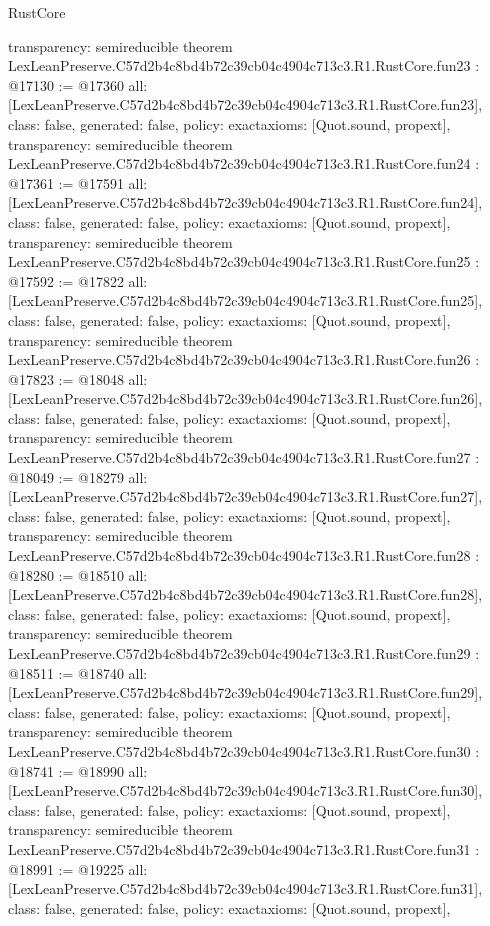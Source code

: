 \begin{lexlean}{RustCore}
\begin{coremodule}
{  transparency: semireducible
}
theorem LexLeanPreserve.C57d2b4c8bd4b72c39cb04c4904c713c3.R1.RustCore.fun23 : @17130 := @17360 {
  all: [LexLeanPreserve.C57d2b4c8bd4b72c39cb04c4904c713c3.R1.RustCore.fun23],
  class: false,
  generated: false,
  policy: exact{axioms: [Quot.sound, propext]},
  transparency: semireducible
}
theorem LexLeanPreserve.C57d2b4c8bd4b72c39cb04c4904c713c3.R1.RustCore.fun24 : @17361 := @17591 {
  all: [LexLeanPreserve.C57d2b4c8bd4b72c39cb04c4904c713c3.R1.RustCore.fun24],
  class: false,
  generated: false,
  policy: exact{axioms: [Quot.sound, propext]},
  transparency: semireducible
}
theorem LexLeanPreserve.C57d2b4c8bd4b72c39cb04c4904c713c3.R1.RustCore.fun25 : @17592 := @17822 {
  all: [LexLeanPreserve.C57d2b4c8bd4b72c39cb04c4904c713c3.R1.RustCore.fun25],
  class: false,
  generated: false,
  policy: exact{axioms: [Quot.sound, propext]},
  transparency: semireducible
}
theorem LexLeanPreserve.C57d2b4c8bd4b72c39cb04c4904c713c3.R1.RustCore.fun26 : @17823 := @18048 {
  all: [LexLeanPreserve.C57d2b4c8bd4b72c39cb04c4904c713c3.R1.RustCore.fun26],
  class: false,
  generated: false,
  policy: exact{axioms: [Quot.sound, propext]},
  transparency: semireducible
}
theorem LexLeanPreserve.C57d2b4c8bd4b72c39cb04c4904c713c3.R1.RustCore.fun27 : @18049 := @18279 {
  all: [LexLeanPreserve.C57d2b4c8bd4b72c39cb04c4904c713c3.R1.RustCore.fun27],
  class: false,
  generated: false,
  policy: exact{axioms: [Quot.sound, propext]},
  transparency: semireducible
}
theorem LexLeanPreserve.C57d2b4c8bd4b72c39cb04c4904c713c3.R1.RustCore.fun28 : @18280 := @18510 {
  all: [LexLeanPreserve.C57d2b4c8bd4b72c39cb04c4904c713c3.R1.RustCore.fun28],
  class: false,
  generated: false,
  policy: exact{axioms: [Quot.sound, propext]},
  transparency: semireducible
}
theorem LexLeanPreserve.C57d2b4c8bd4b72c39cb04c4904c713c3.R1.RustCore.fun29 : @18511 := @18740 {
  all: [LexLeanPreserve.C57d2b4c8bd4b72c39cb04c4904c713c3.R1.RustCore.fun29],
  class: false,
  generated: false,
  policy: exact{axioms: [Quot.sound, propext]},
  transparency: semireducible
}
theorem LexLeanPreserve.C57d2b4c8bd4b72c39cb04c4904c713c3.R1.RustCore.fun30 : @18741 := @18990 {
  all: [LexLeanPreserve.C57d2b4c8bd4b72c39cb04c4904c713c3.R1.RustCore.fun30],
  class: false,
  generated: false,
  policy: exact{axioms: [Quot.sound, propext]},
  transparency: semireducible
}
theorem LexLeanPreserve.C57d2b4c8bd4b72c39cb04c4904c713c3.R1.RustCore.fun31 : @18991 := @19225 {
  all: [LexLeanPreserve.C57d2b4c8bd4b72c39cb04c4904c713c3.R1.RustCore.fun31],
  class: false,
  generated: false,
  policy: exact{axioms: [Quot.sound, propext]},
}
\end{coremodule}
\end{lexlean}
